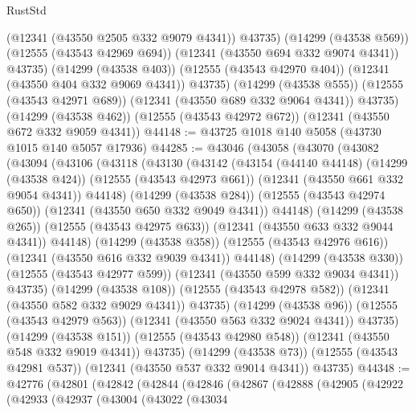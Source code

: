 \begin{lexlean}{RustStd}
\begin{coremodule}
            (@12341 (@43550 @2505 @332 @9079 @4341))
            @43735)
          (@14299 (@43538 @569))
          (@12555 (@43543 @42969 @694))
          (@12341 (@43550 @694 @332 @9074 @4341))
          @43735)
        (@14299 (@43538 @403))
        (@12555 (@43543 @42970 @404))
        (@12341 (@43550 @404 @332 @9069 @4341))
        @43735)
      (@14299 (@43538 @555))
      (@12555 (@43543 @42971 @689))
      (@12341 (@43550 @689 @332 @9064 @4341))
      @43735)
    (@14299 (@43538 @462))
    (@12555 (@43543 @42972 @672))
    (@12341 (@43550 @672 @332 @9059 @4341))
@44148 := @43725 @1018 @140 @5058 (@43730 @1015 @140 @5057 @17936)
@44285 := @43046
    (@43058
      (@43070
        (@43082
          (@43094
            (@43106
              (@43118
                (@43130
                  (@43142
                    (@43154
                      (@44140 @44148)
                      (@14299 (@43538 @424))
                      (@12555 (@43543 @42973 @661))
                      (@12341 (@43550 @661 @332 @9054 @4341))
                      @44148)
                    (@14299 (@43538 @284))
                    (@12555 (@43543 @42974 @650))
                    (@12341 (@43550 @650 @332 @9049 @4341))
                    @44148)
                  (@14299 (@43538 @265))
                  (@12555 (@43543 @42975 @633))
                  (@12341 (@43550 @633 @332 @9044 @4341))
                  @44148)
                (@14299 (@43538 @358))
                (@12555 (@43543 @42976 @616))
                (@12341 (@43550 @616 @332 @9039 @4341))
                @44148)
              (@14299 (@43538 @330))
              (@12555 (@43543 @42977 @599))
              (@12341 (@43550 @599 @332 @9034 @4341))
              @43735)
            (@14299 (@43538 @108))
            (@12555 (@43543 @42978 @582))
            (@12341 (@43550 @582 @332 @9029 @4341))
            @43735)
          (@14299 (@43538 @96))
          (@12555 (@43543 @42979 @563))
          (@12341 (@43550 @563 @332 @9024 @4341))
          @43735)
        (@14299 (@43538 @151))
        (@12555 (@43543 @42980 @548))
        (@12341 (@43550 @548 @332 @9019 @4341))
        @43735)
      (@14299 (@43538 @73))
      (@12555 (@43543 @42981 @537))
      (@12341 (@43550 @537 @332 @9014 @4341))
      @43735)
@44348 := @42776
    (@42801
      (@42842
        (@42844
          (@42846
            (@42867
              (@42888
                (@42905
                  (@42922
                    (@42933
                      (@42937
                        (@43004
                          (@43022
                            (@43034

\end{coremodule}
\end{lexlean}
